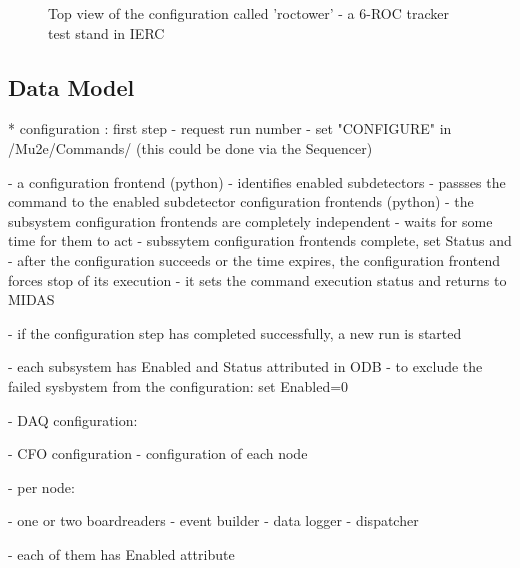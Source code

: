 \begin{figure}[H]
  \caption{
    \label{figure:configuration_top}
    Top view of the configuration called 'roctower' - a 6-ROC tracker test stand in IERC
  }
\end{figure}

\subsection{Data Model}

* configuration  : first step                                                
- request run number
- set "CONFIGURE" in /Mu2e/Commands/ (this could be done via the Sequencer)

- a configuration frontend (python)
  - identifies enabled subdetectors
  - passses the command to the enabled subdetector configuration frontends (python)
  - the subsystem configuration frontends are completely independent
  - waits for some time for them to act
  - subssytem configuration frontends complete, set Status and 
  - after the configuration succeeds or the time expires, the configuration
    frontend forces stop of its execution
  - it sets the command execution status and returns to MIDAS

- if the configuration step has completed successfully, a new run is started

- each subsystem has Enabled and Status attributed in ODB
- to exclude the failed sysbystem from the configuration: set Enabled=0

- DAQ configuration:

  - CFO configuration
  - configuration of each node

  - per node:

    - one or two boardreaders
    - event builder
    - data logger
    - dispatcher

    - each of them has Enabled attribute

